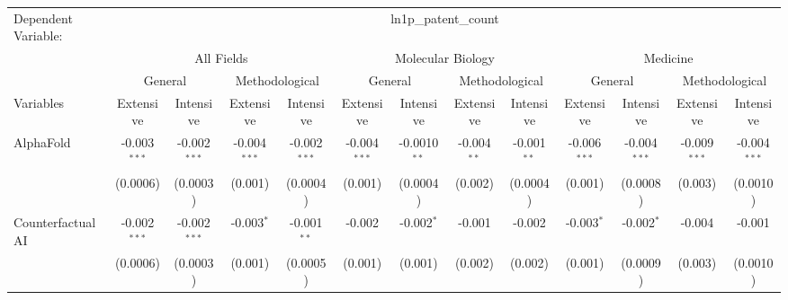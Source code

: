 \begingroup
\centering
\begin{tabular}{lcccccccccccc}
   \tabularnewline \midrule \midrule
   Dependent Variable: & \multicolumn{12}{c}{ln1p\_patent\_count}\\
 & \multicolumn{4}{c}{All Fields} & \multicolumn{4}{c}{Molecular Biology} & \multicolumn{4}{c}{Medicine} \\
\cmidrule(lr){2-5} \cmidrule(lr){6-9} \cmidrule(lr){10-13}
 & \multicolumn{2}{c}{General} & \multicolumn{2}{c}{Methodological} & \multicolumn{2}{c}{General} & \multicolumn{2}{c}{Methodological} & \multicolumn{2}{c}{General} & \multicolumn{2}{c}{Methodological} \\
\cmidrule(lr){2-3} \cmidrule(lr){4-5} \cmidrule(lr){6-7} \cmidrule(lr){8-9} \cmidrule(lr){10-11} \cmidrule(lr){12-13}
Variables & \multicolumn{1}{c}{Extensive} & \multicolumn{1}{c}{Intensive} & \multicolumn{1}{c}{Extensive} & \multicolumn{1}{c}{Intensive} & \multicolumn{1}{c}{Extensive} & \multicolumn{1}{c}{Intensive} & \multicolumn{1}{c}{Extensive} & \multicolumn{1}{c}{Intensive} & \multicolumn{1}{c}{Extensive} & \multicolumn{1}{c}{Intensive} & \multicolumn{1}{c}{Extensive} & \multicolumn{1}{c}{Intensive} \\
\cmidrule(lr){1-1}\cmidrule(lr){2-2} \cmidrule(lr){3-3} \cmidrule(lr){4-4} \cmidrule(lr){5-5} \cmidrule(lr){6-6} \cmidrule(lr){7-7} \cmidrule(lr){8-8} \cmidrule(lr){9-9} \cmidrule(lr){10-10} \cmidrule(lr){11-11} \cmidrule(lr){12-12} \cmidrule(lr){13-13}
   AlphaFold                                & -0.003$^{***}$ & -0.002$^{***}$  & -0.004$^{***}$ & -0.002$^{***}$  & -0.004$^{***}$ & -0.0010$^{**}$ & -0.004$^{**}$ & -0.001$^{**}$  & -0.006$^{***}$ & -0.004$^{***}$  & -0.009$^{***}$ & -0.004$^{***}$\\   
                                            & (0.0006)       & (0.0003)        & (0.001)        & (0.0004)        & (0.001)        & (0.0004)       & (0.002)       & (0.0004)       & (0.001)        & (0.0008)        & (0.003)        & (0.0010)\\   
   Counterfactual AI                        & -0.002$^{***}$ & -0.002$^{***}$  & -0.003$^{*}$   & -0.001$^{**}$   & -0.002         & -0.002$^{*}$   & -0.001        & -0.002         & -0.003$^{*}$   & -0.002$^{*}$    & -0.004         & -0.001\\   
                                            & (0.0006)       & (0.0003)        & (0.001)        & (0.0005)        & (0.001)        & (0.001)        & (0.002)       & (0.002)        & (0.001)        & (0.0009)        & (0.003)        & (0.0010)\\   

\end{tabular}
